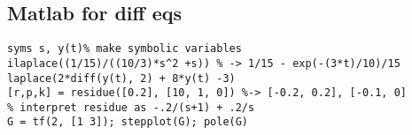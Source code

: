 \documentclass{article}
\begin{document}
\begin{multicols*}{2}
\begin{itemize}
\section{Matlab for diff eqs}
\begin{lstlisting}
syms s, y(t)% make symbolic variables
ilaplace((1/15)/((10/3)*s^2 +s)) % -> 1/15 - exp(-(3*t)/10)/15
laplace(2*diff(y(t), 2) + 8*y(t) -3)
[r,p,k] = residue([0.2], [10, 1, 0]) %-> [-0.2, 0.2], [-0.1, 0] 
% interpret residue as -.2/(s+1) + .2/s
G = tf(2, [1 3]); stepplot(G); pole(G)


\end{lstlisting}



\end{itemize}
\end{multicols*}
\end{document}
